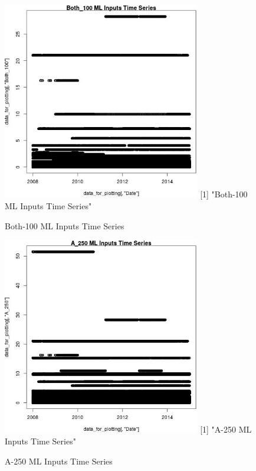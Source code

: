 \begin{figure} 
\centering  
\includegraphics[width=0.77\textwidth]{Code_Outputs/ML_input_report_ML_input_PM25_Step5_part_d_de_duplicated_aves_ML_input_Both_100TS.jpg} 
[1] "Both-100 ML Inputs Time Series"
\caption{\label{fig:ML_input_report_ML_input_PM25_Step5_part_d_de_duplicated_aves_ML_inputBoth_100TS}Both-100 ML Inputs Time Series} 
\end{figure} 
 

\begin{figure} 
\centering  
\includegraphics[width=0.77\textwidth]{Code_Outputs/ML_input_report_ML_input_PM25_Step5_part_d_de_duplicated_aves_ML_input_A_250TS.jpg} 
[1] "A-250 ML Inputs Time Series"
\caption{\label{fig:ML_input_report_ML_input_PM25_Step5_part_d_de_duplicated_aves_ML_inputA_250TS}A-250 ML Inputs Time Series} 
\end{figure} 
 

